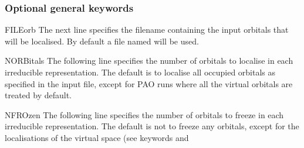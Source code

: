 \subsubsection{Optional general keywords}
\begin{keywordlist}
\item[FILEorb]
The next line specifies the filename containing the input orbitals that will
be localised. By default a file named  will be used.
\item[NORBitals]
The following line specifies the number of orbitals to localise in each
irreducible representation. The default is to localise all occupied
orbitals as specified in the  input file, except for PAO runs where
all the virtual orbitals are treated by default.
\item[NFROzen]
The following line specifies the number of orbitals to freeze in each
irreducible representation. The default is not to freeze any orbitals,
except for the localisations of the virtual space (see keywords  and

\end{keywordlist}
